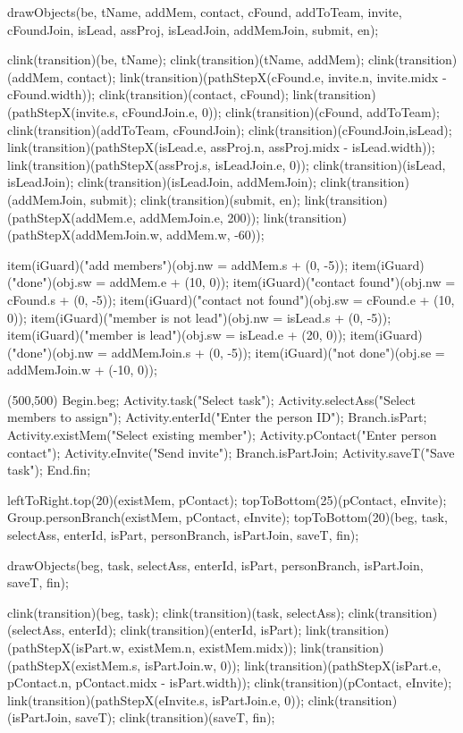 \begin{empfile}
\begin{empdef}[activityR2]
drawObjects(be, tName, addMem, contact, cFound, addToTeam, invite, cFoundJoin, isLead, assProj, isLeadJoin, addMemJoin, submit, en);

clink(transition)(be, tName);
clink(transition)(tName, addMem);
clink(transition)(addMem, contact);
link(transition)(pathStepX(cFound.e, invite.n, invite.midx - cFound.width));
clink(transition)(contact, cFound);
link(transition)(pathStepX(invite.s, cFoundJoin.e, 0));
clink(transition)(cFound, addToTeam);
clink(transition)(addToTeam, cFoundJoin);
clink(transition)(cFoundJoin,isLead);
link(transition)(pathStepX(isLead.e, assProj.n, assProj.midx - isLead.width));
link(transition)(pathStepX(assProj.s, isLeadJoin.e, 0));
clink(transition)(isLead, isLeadJoin);
clink(transition)(isLeadJoin, addMemJoin);
clink(transition)(addMemJoin, submit); 
clink(transition)(submit, en);
link(transition)(pathStepX(addMem.e, addMemJoin.e, 200));
link(transition)(pathStepX(addMemJoin.w, addMem.w, -60));

item(iGuard)("add members")(obj.nw = addMem.s + (0, -5));
item(iGuard)("done")(obj.sw = addMem.e + (10, 0));
item(iGuard)("contact found")(obj.nw = cFound.s + (0, -5));
item(iGuard)("contact not found")(obj.sw = cFound.e + (10, 0));
item(iGuard)("member is not lead")(obj.nw = isLead.s + (0, -5));
item(iGuard)("member is lead")(obj.sw = isLead.e + (20, 0));
item(iGuard)("done")(obj.nw = addMemJoin.s + (0, -5));
item(iGuard)("not done")(obj.se = addMemJoin.w + (-10, 0));
\end{empdef}

\begin{empdef}[activityR4](500,500)
Begin.beg;
Activity.task("Select task");
Activity.selectAss("Select members to assign");
Activity.enterId("Enter the person ID");
Branch.isPart;
Activity.existMem("Select existing member");
Activity.pContact("Enter person contact");
Activity.eInvite("Send invite");
Branch.isPartJoin;
Activity.saveT("Save task");
End.fin;

leftToRight.top(20)(existMem, pContact);
topToBottom(25)(pContact, eInvite);
Group.personBranch(existMem, pContact, eInvite);
topToBottom(20)(beg, task, selectAss, enterId, isPart, personBranch, isPartJoin, saveT, fin);

drawObjects(beg, task, selectAss, enterId, isPart, personBranch, isPartJoin, saveT, fin);

clink(transition)(beg, task);
clink(transition)(task, selectAss);
clink(transition)(selectAss, enterId);
clink(transition)(enterId, isPart);
link(transition)(pathStepX(isPart.w, existMem.n, existMem.midx));
link(transition)(pathStepX(existMem.s, isPartJoin.w, 0));
link(transition)(pathStepX(isPart.e, pContact.n, pContact.midx - isPart.width));
clink(transition)(pContact, eInvite);
link(transition)(pathStepX(eInvite.s, isPartJoin.e, 0));
clink(transition)(isPartJoin, saveT);
clink(transition)(saveT, fin);


\end{empdef}
\end{empfile}
